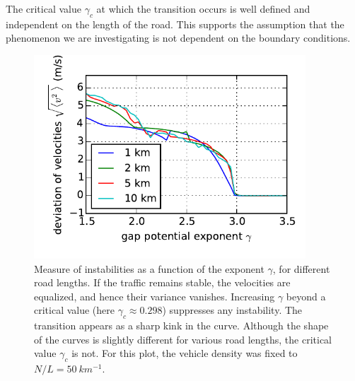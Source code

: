 The critical value $\gamma_c$ at which the transition occurs is well defined and independent on the length of the road. This supports the assumption that the phenomenon we are investigating is not dependent on the boundary conditions.
\begin{figure}
    \centering
    \includegraphics[width=4in]{../img/order_parameter_sweep.pdf}
    \caption{Measure of instabilities as a function of the exponent $\gamma$, for different road lengths. If the traffic remains stable, the velocities are equalized, and hence their variance vanishes. Increasing $\gamma$ beyond a critical value (here $\gamma_c \approx 0.298$) suppresses any instability. The transition appears as a sharp kink in the curve. Although the shape of the curves is slightly different for various road lengths, the critical value $\gamma_c$ is not. For this plot, the vehicle density was fixed to $N/L=\SI{50}{km^{-1}}$.}
    \label{fig:order_param}
\end{figure}

